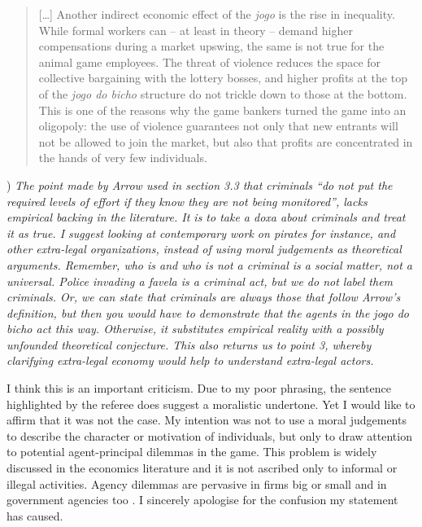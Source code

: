 \documentclass[a4paper,12pt]{article}
\begin{document}
\begin{quote}
	[\dots] Another indirect economic effect of the \textit{jogo} is the rise in inequality. While formal workers can -- at least in theory -- demand higher compensations during a market upswing, the same is not true for the animal game employees. The threat of violence reduces the space for collective bargaining with the lottery bosses, and higher profits at the top of the \textit{jogo do bicho} structure do not trickle down to those at the bottom. This is one of the reasons why the game bankers turned the game into an oligopoly: the use of violence guarantees not only that new entrants will not be allowed to join the market, but also that profits are concentrated in the hands of very few individuals.  
\end{quote}

\vspace{.5cm}

) \textit{The point made by Arrow used in section 3.3 that criminals ``do not put the required levels of effort if they know they are not being monitored'', lacks empirical backing in the literature. It is to take a doxa about criminals and treat it as true. I suggest looking at contemporary work on pirates for instance, and other extra-legal organizations, instead of using moral judgements as theoretical arguments. Remember, who is and who is not a criminal is a social matter, not a universal. Police invading a favela is a criminal act, but we do not label them criminals. Or, we can state that criminals are always those that follow Arrow's definition, but then you would have to demonstrate that the agents in the jogo do bicho act this way. Otherwise, it substitutes empirical reality with a possibly unfounded theoretical conjecture. This also returns us to point 3, whereby clarifying extra-legal economy would help to understand extra-legal actors.} 
\vspace{.25cm}

I think this is an important criticism. Due to my poor phrasing, the sentence highlighted by the referee does suggest a moralistic undertone. Yet I would like to affirm that it was not the case. My intention was not to use a moral judgements to describe the character or motivation of individuals, but only to draw attention to potential agent-principal dilemmas in the game. This problem is widely discussed in the economics literature and it is not ascribed only to informal or illegal activities. Agency dilemmas are pervasive in firms big or small and in government agencies too \citep[e.g.,][]{grossman1983analysis,laffont2009theory,sappington1991incentives}. I sincerely apologise for the confusion my statement has caused.
\end{document}
